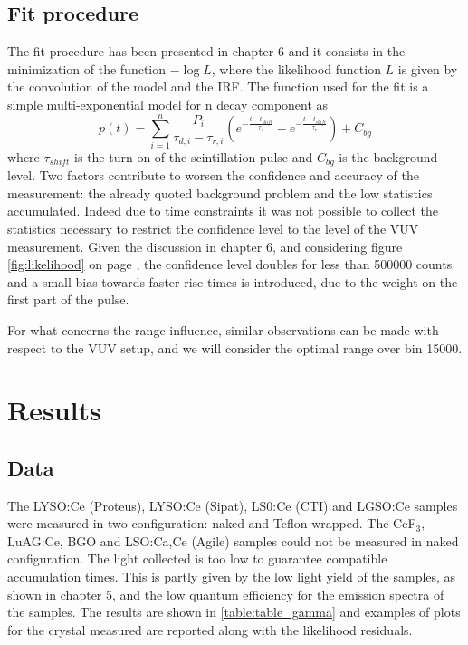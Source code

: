 \subsection{Fit procedure}
The fit procedure has been presented in chapter 6 and it consists in the minimization of the function $-\log{L}$, where the likelihood function $L$ is given by the convolution of the model and the IRF.
The function used for the fit is a simple multi-exponential model for n decay component as
\begin{equation}
p(t) = \sum _{i = 1}^{n} \frac{P_{i}}{\tau _{d, i} - \tau _{r, i}}\left( e^{-\frac{t-t_{shift}}{\tau _{d}}} - e^{-\frac{t-t_{shift}}{\tau _{r}}} \right) + C_{bg}
\end{equation}
where $\tau _{shift}$ is the turn-on of the scintillation pulse and $C_{bg}$ is the background level.
Two factors contribute to worsen the confidence and accuracy of the measurement: the already quoted background problem and the low statistics accumulated.
Indeed due to time constraints it was not possible to collect the statistics necessary to restrict the confidence level to the level of the VUV measurement. Given the discussion in chapter 6, and considering figure \ref{fig:likelihood} on page \pageref{fig:likelihood}, the confidence level doubles for less than 500000 counts and a small bias towards faster rise times is introduced, due to the weight on the first part of the pulse.

For what concerns the range influence, similar observations can be made with respect to the VUV setup, and we will consider the optimal range over bin 15000.
\section{Results}
\subsection{Data}
The LYSO:Ce (Proteus), LYSO:Ce (Sipat), LS0:Ce (CTI) and LGSO:Ce samples were measured in two configuration: naked and Teflon wrapped. 
The CeF$_{3}$, LuAG:Ce, BGO and LSO:Ca,Ce (Agile) samples could not be measured in naked configuration. The light collected is too low to guarantee compatible accumulation times. This is partly given by the low light yield of the samples, as shown in chapter 5, and the low quantum efficiency for the emission spectra of the samples.
The results are shown in \ref{table:table_gamma} and examples of plots for the crystal measured are reported along with the likelihood residuals.

